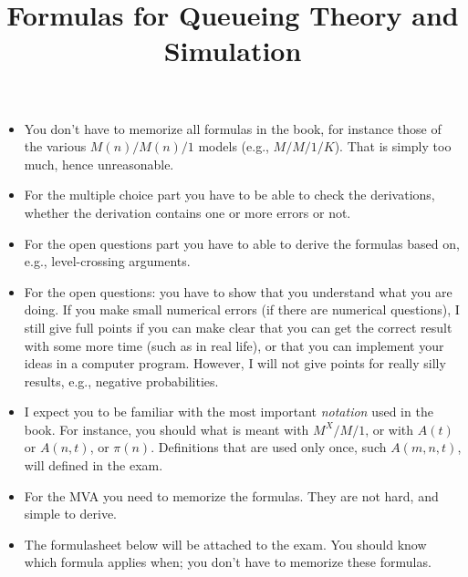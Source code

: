 \documentclass[a4paper,11pt]{scrbook}
\title{Formulas for Queueing Theory and Simulation}
\begin{document}
\maketitle


\begin{itemize}
\item You don't have to memorize all formulas in the book, for instance those of the various $M(n)/M(n)/1$ models (e.g., $M/M/1/K$). That is simply too much, hence unreasonable.
\item For the multiple choice part you have to be able to check the derivations, whether the derivation contains one or more errors or not.
\item For the open questions part you have to able to derive the formulas based on, e.g., level-crossing arguments.
\item For the open questions: you have to show that you understand what you are doing. If you make small numerical errors (if there are numerical questions), I still give full points if you can make clear that you can get the correct result with some more time (such as in real life), or that you can implement your ideas in a computer program. However, I will not give points for really silly results, e.g., negative probabilities. 
\item I expect you to be familiar with the most important \emph{notation} used in the book. For instance, you should what is meant with $M^X/M/1$, or with $A(t)$ or $A(n,t)$, or $\pi(n)$.  Definitions that are used only once, such  $A(m,n,t)$, will defined in the exam. 
\item For the MVA you need to memorize the formulas. They are not hard, and simple to derive. 
\item The formulasheet below will be attached to the exam. You should know which formula applies when; you don't have to memorize these formulas.
\end{itemize}

%
%


%
%
%

%
%
%
%
%
% 
%
%
%
% 
%
%
%
%
%
%
%
%
%
%
%
%
\end{document}
